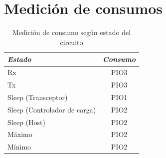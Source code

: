 

\section{Medición de consumos}
\label{sec:Medición}

\begin{table}[ht]
	\centering
	\caption{Medición de consumo según estado del circuito}
	\begin{tabular}{@{} l *1c @{}}    \toprule
		\emph{\textbf{Estado}} & \emph{\textbf{Consumo}}\\
		\midrule
		Rx &  PIO3\\	
		Tx	&  PIO3\\
		Sleep (Transceptor) &  PIO1\\
		Sleep (Controlador de carga) &  PIO2\\
		Sleep (Host) &  PIO2\\
		Máximo &  PIO2\\
		Mínimo &  PIO2\\
		\bottomrule
		\hline
	\end{tabular}
	\label{tab:bq}
\end{table}



